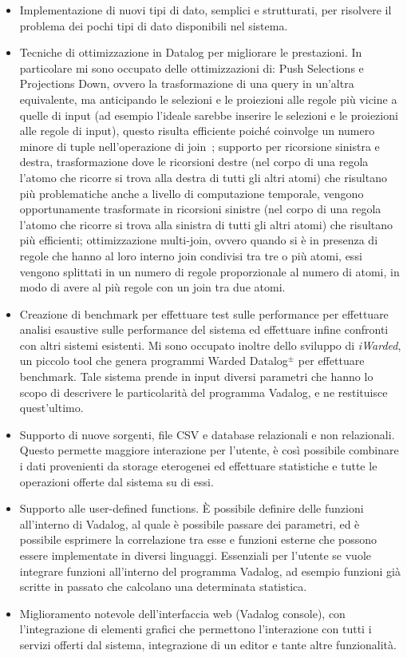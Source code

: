 \begin{itemize}
	\item Implementazione di nuovi tipi di dato, semplici e strutturati, per risolvere il problema dei pochi tipi di dato disponibili nel sistema.
	\item Tecniche di ottimizzazione in Datalog per migliorare le prestazioni. In particolare mi sono occupato delle ottimizzazioni di: Push Selections e Projections Down, ovvero la trasformazione di una query in un'altra equivalente, ma anticipando le selezioni e le proiezioni alle regole più vicine a quelle di input (ad esempio l'ideale sarebbe inserire le selezioni e le proiezioni alle regole di input), questo risulta efficiente poiché coinvolge un numero minore di tuple nell'operazione di join~\cite{atzeni2006basi}; supporto per ricorsione sinistra e destra, trasformazione dove le ricorsioni destre (nel corpo di una regola l'atomo che ricorre si trova alla destra di tutti gli altri atomi) che risultano più problematiche anche a livello di computazione temporale, vengono opportunamente trasformate in ricorsioni sinistre (nel corpo di una regola l'atomo che ricorre si trova alla sinistra di tutti gli altri atomi) che risultano più efficienti; ottimizzazione multi-join, ovvero quando si è in presenza di regole che hanno al loro interno join condivisi tra tre o più atomi, essi vengono splittati in un numero di regole proporzionale al numero di atomi, in modo di avere al più regole con un join tra due atomi.
	\item Creazione di benchmark per effettuare test sulle performance per effettuare analisi esaustive sulle performance del sistema ed effettuare infine confronti con altri sistemi esistenti. Mi sono occupato inoltre dello sviluppo di \textit{iWarded}, un piccolo tool che genera programmi Warded Datalog$^\pm $ per effettuare benchmark. Tale sistema prende in input diversi parametri che hanno lo scopo di descrivere le particolarità del programma Vadalog, e ne restituisce quest'ultimo.
	\item Supporto di nuove sorgenti, file CSV e database relazionali e non relazionali. Questo permette maggiore interazione per l'utente, è così possibile combinare i dati provenienti da storage eterogenei ed effettuare statistiche e tutte le operazioni offerte dal sistema su di essi.
	\item Supporto alle user-defined functions. È possibile definire delle funzioni all'interno di Vadalog, al quale è possibile passare dei parametri, ed è possibile esprimere la correlazione tra esse e funzioni esterne che possono essere implementate in diversi linguaggi. Essenziali per l'utente se vuole integrare funzioni all'interno del programma Vadalog, ad esempio funzioni già scritte in passato che calcolano una determinata statistica.
	\item Miglioramento notevole dell'interfaccia web (Vadalog console), con l'integrazione di elementi grafici che permettono l'interazione con tutti i servizi offerti dal sistema, integrazione di un editor e tante altre funzionalità. \newline
\end{itemize} 

